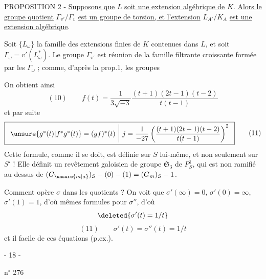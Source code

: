 PROPOSITION 2 - \uline{Supposons que} $L$ \uline{soit une extension algébrique de} $K$. \uline{Alors le groupe quotient} $\Gamma_{v'}/\Gamma_v$ \uline{est un groupe de torsion, et l'extension} $L_{A'}/K_A$ \uline{est une extension algébrique}.

Soit $\{L_\omega\}$ la famille des extensions finies de $K$ contenues dans $L$, et soit $\Gamma_\omega=v'(L_\omega^*)$. Le groupe $\Gamma_{v'}$ est réunion de la famille filtrante croissante formée par les $\Gamma_\omega$ ; comme, d'après la prop.1, les groupes

On obtient ainsi
\[
(10)\qquad f(t)=\frac1{3\sqrt{-3}}\frac{(t+1)(2t-1)(t-2)}{t(t-1)}
\]
et par suite
\[
\boxed{\begin{array}{c|c}\unsure{g^*(t)|f^*g^*(t)}=(gf)^*(t)&j=\dfrac1{-27}\left(\dfrac{(t+1)(2t-1)(t-2)}{t(t-1)}\right)^2\end{array}}\qquad(11)
\]
Cette formule, comme il se doit, est définie sur $S$ lui-même, et non seulement sur $S'$ ! Elle définit un revêtement galoisien de groupe $\mathfrak S_3$ de  $P^1_S$,  qui est non ramifié au dessus de $(G_{\unsure{m|a}})_S-(0)-(1)=(G_m)_S-1$.

Comment opère $\sigma$ dans les quotients ?
On voit que $\sigma'(\infty)=0$, $\sigma'(0)=\infty$, $\sigma'(1)=1$, d'où mêmes formules pour $\sigma''$, d'où
\[
\deleted{\sigma'(t)=1/t}
\]
\[
(11)\qquad\sigma'(t)=\sigma''(t)=1/t
\]
et il  facile de  ces équations  (p.ex.).

\begin{center}- 18 -\end{center}
\hfill n$^\circ$ 276

